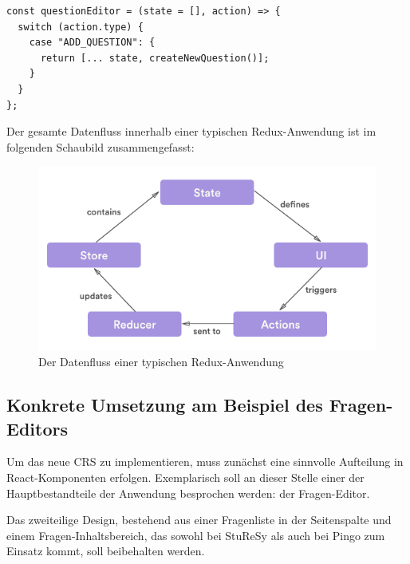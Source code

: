 \begin{minipage}{\linewidth}
\begin{lstlisting}[caption={In einem Reducer werden die Änderungsoperationen eines Stores als pure Funktion implementiert.}]
const questionEditor = (state = [], action) => {
  switch (action.type) {
    case "ADD_QUESTION": {
      return [... state, createNewQuestion()];
    }
  }
};
\end{lstlisting}
\end{minipage}

Der gesamte Datenfluss innerhalb einer typischen Redux-Anwendung ist im folgenden Schaubild zusammengefasst:

\begin{figure}[H]
    \includegraphics[width=\textwidth]{chapter/entwurf/bilder/redux_flow.png}
    \centering
    \caption[Datenfluss einer typischen Redux-Anwendung.]{Der Datenfluss einer typischen Redux-Anwendung\protect\footnotemark}
    \label{abb:redux_flow}
\end{figure}



\subsection{Konkrete Umsetzung am Beispiel des Fragen-Editors}
Um das neue CRS zu implementieren, muss zunächst eine sinnvolle Aufteilung in React-Komponenten erfolgen. Exemplarisch soll an dieser Stelle einer der Hauptbestandteile der Anwendung besprochen werden: der Fragen-Editor.

Das zweiteilige Design, bestehend aus einer Fragenliste in der Seitenspalte und einem Fragen-Inhaltsbereich, das sowohl bei StuReSy als auch bei Pingo zum Einsatz kommt, soll beibehalten werden.


